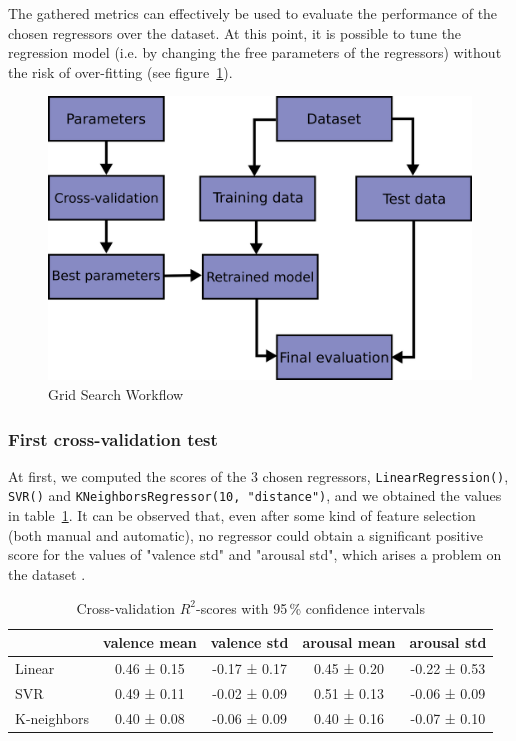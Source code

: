 The gathered metrics can effectively be used to evaluate the performance of the chosen regressors over the dataset. At this point, it is possible to tune the regression model (i.e. by changing the free parameters of the regressors) without the risk of over-fitting (see figure~\ref{fig:grid-search-workflow}).

\begin{figure}
	\centering
	\includegraphics[width=0.5\linewidth]{assets/grid_search_workflow.png}
	\caption{Grid Search Workflow \cite{sklearn-crossval}}
	\label{fig:grid-search-workflow}
\end{figure}

\subsubsection{First cross-validation test}

At first, we computed the scores of the 3 chosen regressors, \texttt{LinearRegression()}, \texttt{SVR()} and \texttt{KNeighborsRegressor(10, "distance")}, and we obtained the values in table~\ref{table:cross-scores}. It can be observed that, even after some kind of feature selection (both manual and automatic), no regressor could obtain a significant positive score for the values of "valence std" and "arousal std", which arises a problem on the dataset .

\begin{table}
	\centering
	\begin{tabular}{lcccc}
		\toprule
		& valence mean & valence std & arousal mean & arousal std \\
		\midrule
		Linear & 0.46 ± 0.15 & -0.17 ± 0.17 & 0.45 ± 0.20 & -0.22 ± 0.53 \\
		SVR & 0.49 ± 0.11 & -0.02 ± 0.09 & 0.51 ± 0.13 & -0.06 ± 0.09 \\
		K-neighbors & 0.40 ± 0.08 & -0.06 ± 0.09 & 0.40 ± 0.16 & -0.07 ± 0.10 \\
		\bottomrule
	\end{tabular}
	\caption{Cross-validation $R^2$-scores with 95\,\% confidence intervals}
	\label{table:cross-scores}
\end{table}


